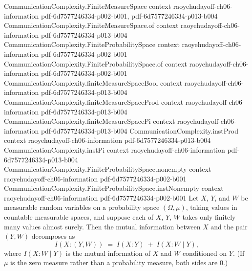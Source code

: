 \begin{theorem}
\proofstep
  {CommunicationComplexity.FiniteMeasureSpace}
  {context}
  {raoyehudayoff-ch06-information}
  {pdf-6d7577246334-p002-b001,
    pdf-6d7577246334-p013-b004}
\proofstep
  {CommunicationComplexity.FiniteMeasureSpace.of}
  {context}
  {raoyehudayoff-ch06-information}
  {pdf-6d7577246334-p013-b004}
\proofstep
  {CommunicationComplexity.FiniteProbabilitySpace}
  {context}
  {raoyehudayoff-ch06-information}
  {pdf-6d7577246334-p002-b001}
\proofstep
  {CommunicationComplexity.FiniteProbabilitySpace.of}
  {context}
  {raoyehudayoff-ch06-information}
  {pdf-6d7577246334-p002-b001}
\proofstep
  {CommunicationComplexity.finiteMeasureSpaceBool}
  {context}
  {raoyehudayoff-ch06-information}
  {pdf-6d7577246334-p013-b004}
\proofstep
  {CommunicationComplexity.finiteMeasureSpaceProd}
  {context}
  {raoyehudayoff-ch06-information}
  {pdf-6d7577246334-p013-b004}
\proofstep
  {CommunicationComplexity.finiteMeasureSpacePi}
  {context}
  {raoyehudayoff-ch06-information}
  {pdf-6d7577246334-p013-b004}
\proofstep
  {CommunicationComplexity.instProd}
  {context}
  {raoyehudayoff-ch06-information}
  {pdf-6d7577246334-p013-b004}
\proofstep
  {CommunicationComplexity.instPi}
  {context}
  {raoyehudayoff-ch06-information}
  {pdf-6d7577246334-p013-b004}
\proofstep
  {CommunicationComplexity.FiniteProbabilitySpace.nonempty}
  {context}
  {raoyehudayoff-ch06-information}
  {pdf-6d7577246334-p002-b001}
\proofstep
  {CommunicationComplexity.FiniteProbabilitySpace.instNonempty}
  {context}
  {raoyehudayoff-ch06-information}
  {pdf-6d7577246334-p002-b001}
\label{ProbabilityTheory.mutualInfo_prod_right_eq_add}
\leanok
{}
Let $X$, $Y$, and $W$ be measurable random variables on a probability space $(\Omega,
\mu)$, taking values in countable measurable spaces, and suppose each of $X$, $Y$, $W$
takes only finitely many values almost surely. Then the mutual information between $X$
and the pair $(Y, W)$ decomposes as
\[
  I(X : (Y, W)) \;=\; I(X : Y) \;+\; I(X : W \mid Y),
\]
where $I(X : W \mid Y)$ is the mutual information of $X$ and $W$ conditioned on $Y$. (If
$\mu$ is the zero measure rather than a probability measure, both sides are $0$.)
\end{theorem}

